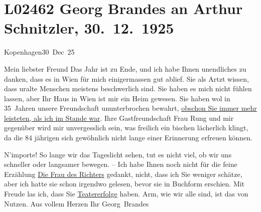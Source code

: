 

\section[Georg Brandes an Arthur Schnitzler, 30. 12. 1925]{L02462 Georg Brandes an Arthur Schnitzler, 30. 12. 1925}
\nopagebreak{}
\rehead{ }\normalsize\beginnumbering{}
\toendnotes[C]{\smallbreak\pagebreak[2]}
\pstart
           \raggedleft{}{\pb}Kopenhagen30 Dec 25\pend
           
\pstart{}Mein liebster Freund\pend\vspace{0.5em}
\pstart
           Das Jahr ist zu Ende, und ich habe Ihnen unendliches zu danken, dass es in Wien für mich einigermassen gut ablief. Sie als
               Artzt wissen, dass uralte Menschen meistens beschwerlich sind. Sie haben es mich
               nicht fühlen lassen, aber Ihr Haus in Wien ist mir
               ein Heim gewesen. Sie haben wol in 35 Jahren unsere Freundschaft ununterbrochen
               bewahrt, \uline{obschon Sie immer mehr leisteten, als ich im
                  Stande war}. Ihre Gastfreundschaft Frau Rung und mir {\pb}gegenüber
               wird mir unvergesslich sein, was freilich ein bischen lächerlich klingt, da die 84
               jährigen sich gewöhnlich nicht lange einer Erinnerung erfreuen können.\pend
           
\pstart
           N’importe! So lange wir das Tageslicht sehen, tut es nicht viel, ob wir uns schneller
               oder langsamer bewegen. – Ich habe Ihnen noch nicht für die feine Erzählung \uline{Die Frau des Richters} gedankt, nicht, dass ich Sie weniger schätze, aber ich hatte sie schon irgendwo
               gelesen, bevor sie in Buchform erschien. Mit Freude las ich, dass Sie \uline{Teatererfolge} haben. Arm, wie wir alle sind, ist das
               von Nutzen. Aus vollem Herzen\pend
           \pstart Ihr \spacefill\mbox{Georg Brandes}\pend{}\endnumbering{}  
      